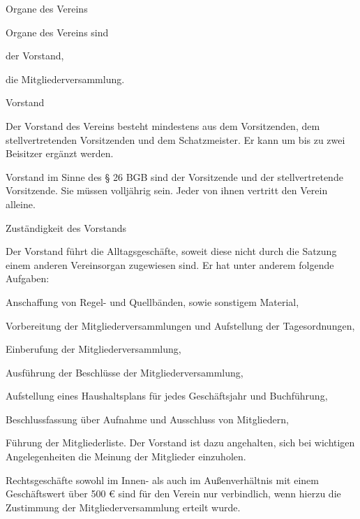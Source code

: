 \documentclass[11pt,a4paper,twoside,openany,article]{memoir}
\begin{document}
\begin{para}{Organe des Vereins}
\label{p:organe}
\item Organe des Vereins sind
  \begin{subpara}
  \item der Vorstand,
  \item die Mitgliederversammlung.
  \end{subpara}
\end{para}

\begin{para}{Vorstand}
  \label{p:vs}
  \item Der Vorstand des Vereins besteht mindestens aus dem Vorsitzenden, dem stellvertretenden Vorsitzenden und dem Schatzmeister.
  Er kann um bis zu zwei Beisitzer ergänzt werden.
  \item Vorstand im Sinne des § 26 BGB sind der Vorsitzende und der stellvertretende Vorsitzende. Sie müssen volljährig sein. Jeder von ihnen vertritt den Verein alleine.
\end{para}

\begin{para}{Zuständigkeit des Vorstands}
  \label{p:vszuständigkeit}
  \item Der Vorstand führt die Alltagsgeschäfte, soweit diese nicht durch die Satzung einem anderen Vereinsorgan zugewiesen sind. Er hat unter anderem folgende Aufgaben:
  \begin{subpara}
    \item Anschaffung von Regel- und Quellbänden, sowie sonstigem Material,
    \item Vorbereitung der Mitgliederversammlungen und Aufstellung der Tagesordnungen,
    \item Einberufung der Mitgliederversammlung,
    \item Ausführung der Beschlüsse der Mitgliederversammlung,
    \item Aufstellung eines Haushaltsplans für jedes Geschäftsjahr und Buchführung,
    \item Beschlussfassung über Aufnahme und Ausschluss von Mitgliedern,
    \item Führung der Mitgliederliste.
    Der Vorstand ist dazu angehalten, sich bei wichtigen Angelegenheiten die Meinung der Mitglieder einzuholen.
  \end{subpara}
  \item Rechtsgeschäfte sowohl im Innen- als auch im Außenverhältnis mit einem Geschäftswert über 500 € sind für den Verein nur verbindlich, wenn hierzu die Zustimmung der Mitgliederversammlung erteilt wurde.
\end{para}
\end{document}
